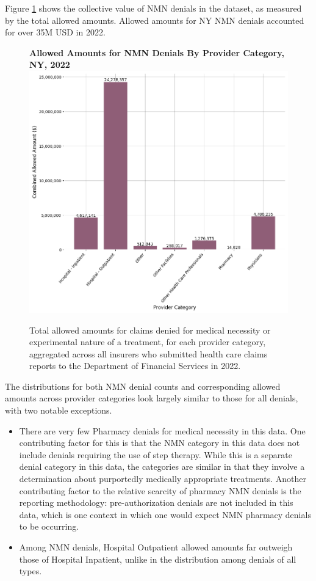 \documentclass[12pt, a4paper,twoside]{report}
\theoremstyle{plain} %
\theoremstyle{definition} %
\theoremstyle{remark} %
\numberwithin{equation}{chapter}
\begin{document}
		Figure \ref{nynmnallowedbyprovidercat} shows the collective value of NMN denials in the dataset, as measured by the total allowed amounts. Allowed amounts for NY NMN denials accounted for over 35M USD in 2022.
		
		\begin{figure}[h!]
			\centering
			\textbf{Allowed Amounts for NMN Denials By Provider Category, NY, 2022}
			\includegraphics[width=\columnwidth]{images/ny_claim_reports/nmn_allowed_amts_by_provider_cat.png}
			\caption{Total allowed amounts for claims denied for medical necessity or experimental nature of a treatment, for each provider category, aggregated across all insurers who submitted health care claims reports to the Department of Financial Services in 2022.}
			\label{nynmnallowedbyprovidercat}
		\end{figure}
	
		
		The distributions for both NMN denial counts and corresponding allowed amounts across provider categories look largely similar to those for all denials, with two notable exceptions.
		
		\begin{itemize}
			\item There are very few Pharmacy denials for medical necessity in this data. One contributing factor for this is that the NMN category in this data does not include denials requiring the use of step therapy. While this is a separate denial category in this data, the categories are similar in that they involve a determination about purportedly medically appropriate treatments. Another contributing factor to the relative scarcity of pharmacy NMN denials is the reporting methodology: pre-authorization denials are not included in this data, which is one context in which one would expect NMN pharmacy denials to be occurring.
			
			\item Among NMN denials, Hospital Outpatient allowed amounts far outweigh those of Hospital Inpatient, unlike in the distribution among denials of all types.
			
		\end{itemize}
	
\end{document}
